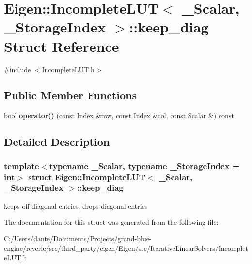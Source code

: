 \hypertarget{struct_eigen_1_1_incomplete_l_u_t_1_1keep__diag}{}\section{Eigen\+::Incomplete\+L\+UT$<$ \+\_\+\+Scalar, \+\_\+\+Storage\+Index $>$\+::keep\+\_\+diag Struct Reference}
\label{struct_eigen_1_1_incomplete_l_u_t_1_1keep__diag}


{\ttfamily \#include $<$Incomplete\+L\+U\+T.\+h$>$}

\subsection*{Public Member Functions}
\begin{DoxyCompactItemize}
\item 
\mbox{\label{struct_eigen_1_1_incomplete_l_u_t_1_1keep__diag_a6c2209490eaaacf837e4153f905def4b}} 
bool {\bfseries operator()} (const Index \&row, const Index \&col, const Scalar \&) const
\end{DoxyCompactItemize}


\subsection{Detailed Description}
\subsubsection*{template$<$typename \+\_\+\+Scalar, typename \+\_\+\+Storage\+Index = int$>$\newline
struct Eigen\+::\+Incomplete\+L\+U\+T$<$ \+\_\+\+Scalar, \+\_\+\+Storage\+Index $>$\+::keep\+\_\+diag}

keeps off-\/diagonal entries; drops diagonal entries 

The documentation for this struct was generated from the following file\+:\begin{DoxyCompactItemize}
\item 
C\+:/\+Users/dante/\+Documents/\+Projects/grand-\/blue-\/engine/reverie/src/third\+\_\+party/eigen/\+Eigen/src/\+Iterative\+Linear\+Solvers/Incomplete\+L\+U\+T.\+h\end{DoxyCompactItemize}
